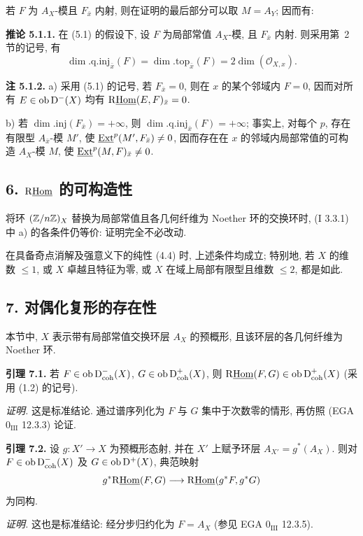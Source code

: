 若 $F$ 为 $A_X$-模且 $F_{\bar{x}}$ 内射, 则在证明的最后部分可以取 $M=A_Y$; 因而有:

\textbf{推论 5.1.1.} 在 (5.1) 的假设下, 设 $F$ 为局部常值 $A_X$-模, 且 $F_{\bar{x}}$ 内射. 则采用第~2 节的记号, 有
\[
        \dim.\mathrm{q.inj}_{\bar{x}}(F)=\dim.\mathrm{top}_{\bar{x}}(F)=2\dim(\mathcal{O}_{X,x}).
\]

\textbf{注 5.1.2.} a) 采用 (5.1) 的记号, 若 $F_{\bar{x}}=0$, 则在 $x$ 的某个邻域内 $F=0$, 因而对所有 $E\in\operatorname{ob}\mathrm{D}^{-}(X)$ 均有 $\mathrm R\underline{\operatorname{Hom}}(E,F)_{\bar{x}}=0$.

b) 若 $\dim.\mathrm{inj}(F_{\bar{x}})=+\infty$, 则 $\dim.\mathrm{q.inj}_{\bar{x}}(F)=+\infty$; 事实上, 对每个 $p$, 存在有限型 $A_{\bar{x}}$-模 $M'$, 使 $\underline{\operatorname{Ext}}^p(M',F_{\bar{x}})\neq0$, 因而存在在 $x$ 的邻域内局部常值的可构造 $A_X$-模 $M$, 使 $\underline{\operatorname{Ext}}^p(M,F)_{\bar{x}}\neq0$.

\subsection*{6. $\mathrm R\underline{\operatorname{Hom}}$ 的可构造性}

将环 $(\mathbb Z/n\mathbb Z)_X$ 替换为局部常值且各几何纤维为 Noether 环的交换环时, (I 3.3.1) 中 a) 的各条件仍等价: 证明完全不必改动.

在具备奇点消解及强意义下的纯性 (4.4) 时, 上述条件均成立; 特别地, 若 $X$ 的维数 $\leq1$, 或 $X$ 卓越且特征为零, 或 $X$ 在域上局部有限型且维数 $\leq2$, 都是如此.

\subsection*{7. 对偶化复形的存在性}

本节中, $X$ 表示带有局部常值交换环层 $A_X$ 的预概形, 且该环层的各几何纤维为 Noether 环.

\textbf{引理 7.1.} 若 $F\in\operatorname{ob}\mathrm{D}^{-}_{\mathrm{coh}}(X)$, $G\in\operatorname{ob}\mathrm{D}^{+}_{\mathrm{coh}}(X)$, 则 $\mathrm R\underline{\operatorname{Hom}}(F,G)\in\operatorname{ob}\mathrm{D}^{+}_{\mathrm{coh}}(X)$ (采用 (1.2) 的记号).

\emph{证明.} 这是标准结论. 通过谱序列化为 $F$ 与 $G$ 集中于次数零的情形, 再仿照 (EGA $0_{\mathrm{III}}$ 12.3.3) 论证.

\textbf{引理 7.2.} 设 $g:X'\to X$ 为预概形态射, 并在 $X'$ 上赋予环层 $A_{X'}=g^*(A_X)$. 则对 $F\in\operatorname{ob}\mathrm{D}^{-}_{\mathrm{coh}}(X)$ 及 $G\in\operatorname{ob}\mathrm{D}^{+}(X)$, 典范映射
\[
        g^*\mathrm R\underline{\operatorname{Hom}}(F,G)\longrightarrow \mathrm R\underline{\operatorname{Hom}}(g^*F,g^*G)
\]
为同构.

\emph{证明.} 这也是标准结论: 经分步归约化为 $F=A_X$ (参见 EGA $0_{\mathrm{III}}$ 12.3.5).

